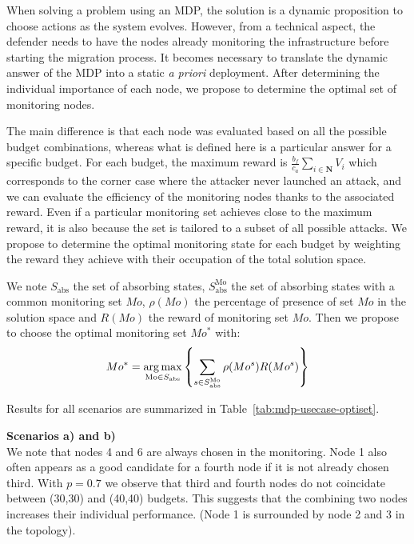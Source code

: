 When solving a problem using an MDP, the solution is a dynamic proposition to choose actions as the system evolves.
However, from a technical aspect, the defender needs to have the nodes already monitoring the infrastructure before starting the migration process.
It becomes necessary to translate the dynamic answer of the MDP into a static \textit{a priori} deployment.
After determining the individual importance of each node, we propose to determine the optimal set of monitoring nodes.

The main difference is that each node was evaluated based on all the possible budget combinations, whereas what is defined here is a particular answer for a specific budget.
For each budget, the maximum reward is $\frac{b_f}{c_a} \sum\limits_{i \in \textbf{N}}V_i $ which corresponds to the corner case where the attacker never launched an attack, and we can evaluate the efficiency of the   monitoring nodes thanks to the associated reward.
Even if a particular monitoring set achieves close to the maximum reward, it is also because the set is tailored to a subset of all possible attacks.
We propose to determine the optimal monitoring state for each budget by weighting the reward they achieve with their occupation of the total solution space.

We note $S_{\text{abs}}$ the set of absorbing states, $S^{\text{Mo}}_{\text{abs}}$ the set of absorbing states with a common  monitoring set $Mo$, $\rho(Mo)$ the percentage of presence of set $Mo$ in the solution space and $R(Mo)$ the reward of monitoring set $Mo$.
Then we propose to choose the optimal monitoring set $Mo^*$ with:
\begin{equation}
    Mo^* = \operatorname*{arg\,max}\limits_{\text{Mo} \in S_{\text{abs}}} \left \{\sum\limits_{s \in S^{\text{Mo}}_{\text{abs}}}\rho(Mo^s)R(Mo^s) \right \}
\end{equation}

Results for all scenarios are summarized in Table~\ref{tab:mdp-usecase-optiset}.



\textbf{Scenarios a) and b)\\}
We note that nodes 4 and 6 are always chosen in the monitoring.
Node 1 also often appears as a good candidate for a fourth node if it is not already chosen third.
With $p=0.7$ we observe that third and fourth nodes do not coincidate between (30,30) and (40,40) budgets.
This suggests that the combining two nodes increases their individual performance.
(Node 1 is surrounded by node 2 and 3 in the topology).

